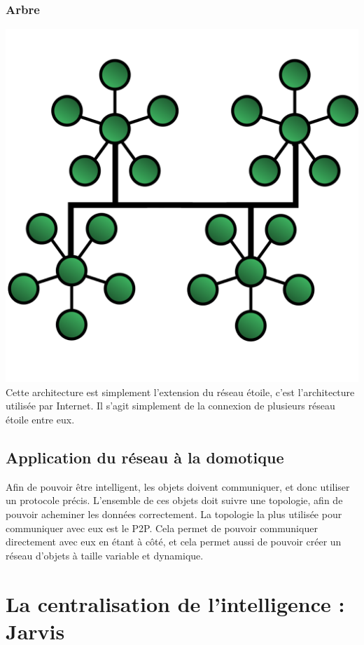 	    \subsubsection{Arbre}
\includegraphics{img/TreeTopology.png}
Cette architecture est simplement l'extension du réseau étoile, c'est l'architecture utilisée par Internet. 
Il s'agit simplement de la connexion de plusieurs réseau étoile entre eux.
	\subsection{Application du réseau à la domotique}
Afin de pouvoir être intelligent, les objets doivent communiquer, et donc utiliser un protocole précis. 
L'ensemble de ces objets doit suivre une topologie, afin de pouvoir acheminer les données correctement. La 
topologie la plus utilisée pour communiquer avec eux est le P2P. Cela permet de pouvoir communiquer 
directement avec eux en étant à côté, et cela permet aussi de pouvoir créer un réseau d'objets à taille 
variable et dynamique.


\section{La centralisation de l’intelligence : Jarvis}

